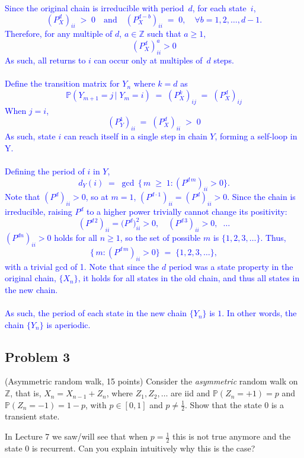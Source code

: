 \documentclass{article}
\begin{document}
\begin{enumerate}
           \textcolor{blue}{Since the original chain is irreducible with period~$d$, for each state~$i$,
\[
    (P^d_X)_{ii} \;>\; 0 \quad \text{and} \quad (P^{d-b}_X)_{ii} \;=\; 0, \quad \forall b = 1, 2, \dots, d-1.
\]
Therefore, for any multiple of $d$, $a\in \mathbb{Z}$ such that $a \geq 1$, $$(P^d_X)^a_{ii} > 0$$
As such, all returns to $i$ can occur only at multiples of~$d$ steps.   \\ \\ 
Define the transition matrix for $Y_n$ where $k=d$ as
\[
  \mathbb{P}(Y_{m+1} = j \,\big|\; Y_m = i)
    \;=\; (P^k_X)_{ij}
  \;=\; (P^d_X)_{ij}
\]
When $j=i$, 
\[
  (P^1_Y)_{ii} 
    \;=\; (P^d_X)_{ii}
  \;>\; 0
\]
As such, state $i$ can reach itself in a single step in chain $Y$, forming a self-loop in Y. \\ \\ 
Defining the period of $i$ in $Y$,
\[
  d_Y(i)
  \;=\;
  \gcd\,\bigl\{\, m \;\ge\; 1 : (P^{d\,m})_{ii} > 0 \bigr\}.
\]
Note that $(P^d)_{ii} > 0$, so at $m=1$, $(P^{d\cdot 1})_{ii} = (P^d)_{ii} > 0$. Since the chain is irreducible, raising $P^d$ to a higher power trivially cannot change its positivity:
\[
   (P^{d\,2})_{ii} = \bigl(P^d\bigr)^2_{ii} > 0, 
   \quad
   (P^{d\,3})_{ii} > 0, 
   \;\;\dots
\]
$(P^{dn})_{ii} > 0$ holds for all $n \ge 1$, so the set of possible $m$ is $\{1,2,3,\dots\}$.
Thus,
\[
  \bigl\{\,m : (P^{d\,m})_{ii} > 0 \bigr\}
  \;=\;
  \{1, 2, 3, \dots\},
\]
with a trivial gcd of 1. Note that since the $d$ period was a state property in the original chain, $\{X_n\}$, it holds for all states in the old chain, and thus all states in the new chain. \\ \\ 
As such, the period of each state in the new chain $\{Y_n\}$ is $1$. In other words, the chain $\{Y_n\}$ is aperiodic.
}
    \end{enumerate}

\subsection*{Problem 3} (Asymmetric random walk, 15 points) Consider the \textit{asymmetric} random walk on $\mathbb{Z}$, that is, $X_n = X_{n-1} + Z_n$, where $Z_1, Z_2, \dots$ are iid and $\mathbb{P}(Z_n = +1) = p$ and $\mathbb{P}(Z_n = -1) = 1 - p$, with $p \in [0,1]$ and $p \neq \frac{1}{2}$. Show that the state 0 is a transient state.

    In Lecture 7 we saw/will see that when $p = \frac{1}{2}$ this is not true anymore and the state 0 is recurrent. Can you explain intuitively why this is the case?
\end{document}

